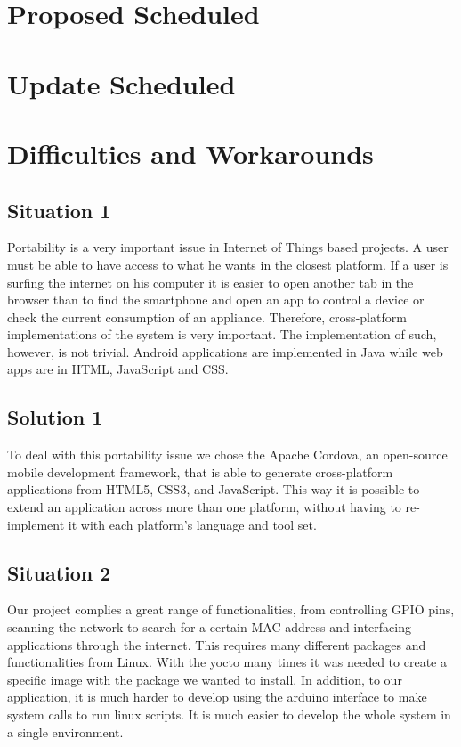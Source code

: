 \documentclass[12pt]{partialreport}
\begin{document}
\maketitle
\content

\section*{Proposed Scheduled}
\oldScheduleTable

\section*{Update Scheduled}
\newScheduleTable

\section*{Difficulties and Workarounds}
\subsection*{Situation 1}
Portability is a very important issue in Internet of Things based projects. A user must be able to have access to what he wants in the closest platform. If a user is surfing the internet on his computer it is easier to open another tab in the browser than to find the smartphone and open an app to control a device or check the current consumption of an appliance. Therefore, cross-platform implementations of the system is very important. The implementation of such, however, is not trivial. Android applications are implemented in Java while web apps are in HTML, JavaScript and CSS.

\subsection*{Solution  1}
To deal with this portability issue we chose the Apache Cordova, an open-source mobile development framework, that is able to generate cross-platform applications from HTML5, CSS3, and JavaScript. This way it is possible to extend an application across more than one platform, without having to re-implement it with each platform's language and tool set.

\subsection*{Situation 2}
Our project complies a great range of  functionalities, from controlling GPIO pins, scanning the network to search for a certain MAC address and interfacing applications through the internet. This requires many different packages and functionalities from Linux. With the yocto many times it was needed to  create a specific image with the package we wanted to install. In addition, to our application, it is much harder to develop using the arduino interface to make system calls to run linux scripts. It is much easier to develop the whole system in a single environment.
\end{document}
